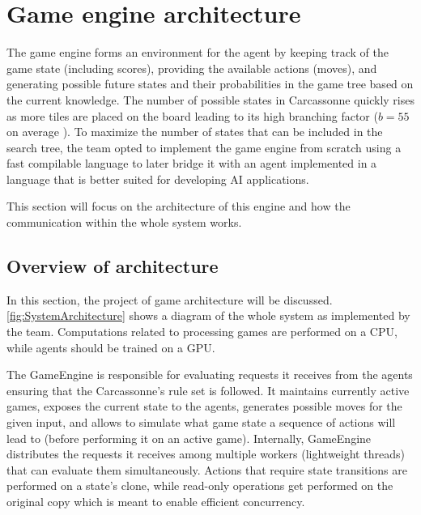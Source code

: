 \section{Game engine architecture}
The game engine forms an environment for the agent by keeping track of the game state (including scores), providing the available actions (moves), and generating possible future states and their probabilities in the game tree based on the current knowledge.
The number of possible states in Carcassonne quickly rises as more tiles are placed on the board leading to its high branching factor ($b = 55$ on average \cite{MasterThesisCarcassonne}).
To maximize the number of states that can be included in the search tree, the team opted to implement the game engine from scratch using a fast compilable language to later bridge it with an agent implemented in a language that is better suited for developing AI applications.

This section will focus on the architecture of this engine and how the communication within the whole system works.

\subsection{Overview of architecture}

In this section, the project of game architecture will be discussed.
\ref{fig:SystemArchitecture} shows a diagram of the whole system as implemented by the team.
Computations related to processing games are performed on a CPU,
while agents should be trained on a GPU.

\begin{figure*}
	\centering
	\scalebox{.48}{}
	\caption{Diagram of the system's architecture}
	\label{fig:SystemArchitecture}
\end{figure*}

The GameEngine is responsible for evaluating requests it receives from the agents
ensuring that the Carcassonne's rule set is followed. It maintains currently active games,
exposes the current state to the agents, generates possible moves for the given input,
and allows to simulate what game state a sequence of actions will lead to (before performing it
on an active game). Internally, GameEngine distributes the requests it receives among
multiple workers (lightweight threads) that can evaluate them simultaneously. Actions that
require state transitions are performed on a state's clone, while read-only operations
get performed on the original copy which is meant to enable efficient concurrency.

